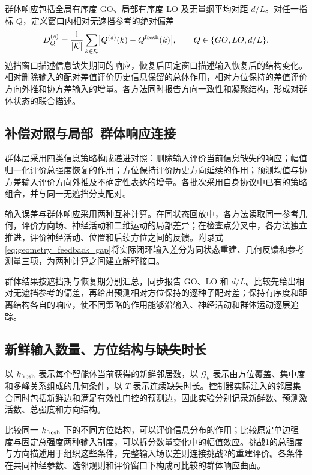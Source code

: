 \documentclass[UTF8,fontset=windows,11pt]{ctexart}
\begin{document}
群体响应包括全局有序度 GO、局部有序度 LO 及无量纲平均对距 $d/L$。对任一指标 $Q$，定义窗口内相对无遮挡参考的绝对偏差
\begin{equation}
 D_Q^{(s)}=\frac{1}{|\mathcal K|}\sum_{k\in\mathcal K}
 \bigl|Q^{(s)}(k)-Q^{\rm fresh}(k)\bigr|,
 \qquad Q\in\{GO,LO,d/L\}.
 \label{eq:v7_group_response}
\end{equation}
遮挡窗口描述信息缺失期间的响应，恢复后固定窗口描述输入恢复后的结构变化。相对删除输入的配对差值评价历史信息保留的总体作用，相对方位保持的差值评价方向外推和协方差输入的增量。各方法同时报告方向一致性和凝聚结构，形成对群体状态的联合描述。

\subsection{补偿对照与局部--群体响应连接}
群体层采用四类信息策略构成递进对照：删除输入评价当前信息缺失的响应；幅值归一化评价总强度恢复的作用；方位保持评价历史方向延续的作用；预测均值与协方差输入评价方向外推及不确定性表达的增量。各批次采用自身协议中已有的策略组合，并与同一无遮挡分支配对。

输入误差与群体响应采用两种互补计算。在同状态回放中，各方法读取同一参考几何，评价方向场、神经活动和二维运动的局部差异；在检查点分叉中，各方法独立推进，评价神经活动、位置和后续方位之间的反馈。附录式\eqref{eq:geometry_feedback_gap}将实际闭环输入差分为同状态重建、几何反馈和参考测量三项，为两种计算之间建立解释接口。

群体结果按遮挡期与恢复期分别汇总，同步报告 GO、LO 和 $d/L$。比较先给出相对无遮挡参考的偏差，再给出预测相对方位保持的逐种子配对差；保持有序度和距离结构各自的响应，使不同策略的作用能够沿输入、神经活动和群体运动逐层追踪。

\subsection{新鲜输入数量、方位结构与缺失时长}
以 $k_{\rm fresh}$ 表示每个智能体当前获得的新鲜邻居数，以 $\mathcal G_\theta$ 表示由方位覆盖、集中度和多峰关系组成的几何条件，以 $T$ 表示连续缺失时长。控制器实际注入的邻居集合同时包括新鲜边和满足有效性门控的预测边，因此实验分别记录新鲜数、预测激活数、总强度和方向结构。

比较同一 $k_{\rm fresh}$ 下的不同方位结构，可以评价信息分布的作用；比较原定单边强度与固定总强度两种输入制度，可以拆分数量变化中的幅值效应。挑战1的总强度与方向描述用于组织这些条件，完整输入场误差则连接挑战2的重建评价。各条件在共同神经参数、选邻规则和评价窗口下构成可比较的群体响应曲面。
\end{document}
